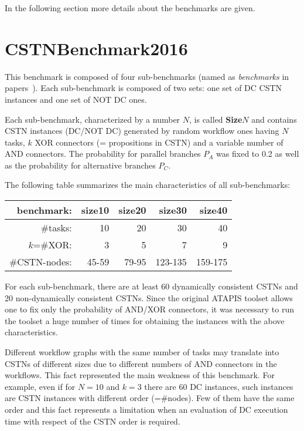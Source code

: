 \documentclass[a4paper,11pt]{article}
\begin{document}
In the following section more details about the benchmarks are given.

\section{CSTNBenchmark2016}

This benchmark is composed of four sub-benchmarks (named as \textit{benchmarks} in papers~\cite{time2015,HunsbergerP16Icaps,CairoEtalTime2017}).
Each sub-benchmark is composed of two sets: one set of DC CSTN instances and one set of NOT DC ones.

Each sub-benchmark, characterized by a number $N$, is called  \textbf{Size$N$} and contains CSTN instances (DC\slash NOT DC) generated by random workflow ones having $N$ tasks, $k$ XOR connectors (= propositions in CSTN) and a variable number of AND connectors. 
The probability for parallel branches $P_A$ was fixed to 0.2 as well as the probability for alternative branches $P_C$. 

The following table summarizes the main characteristics of all sub-benchmarks:
\begin{center}
\begin{tabular}{rrrrr}
	\hline
  \textbf{benchmark}: & \textbf{size10}	& \textbf{size20}	& \textbf{size30}	& \textbf{size40}\\
  \hline
  \#tasks: & 10 & 20 & 30 & 40 \\ 
  $k$=\#XOR: & 3 & 5 & 7 & 9\\%
  \#CSTN-nodes: & 45-59 &79-95& 123-135&159-175\\
  \hline
\end{tabular}
\end{center}
For each sub-benchmark, there are at least 60 dynamically consistent CSTNs and 20 non-dynamically consistent CSTNs.
Since the original ATAPIS toolset allows one to fix only the probability of AND\slash XOR connectors, it was necessary to run the toolset a huge number of times for obtaining the instances with the above characteristics.

\smallskip
Different workflow graphs with the same number of tasks may translate into CSTNs of different sizes due to different numbers of AND connectors in the workflows.
This fact represented the main weakness of this benchmark. 
For example, even if for $N=10$ and $k=3$ there are 60 DC instances, such instances are CSTN instances with different order (=\#nodes). Few of them have the same order and this fact  represents a limitation when an evaluation of DC execution time with respect of the CSTN order is required. 
\end{document}
